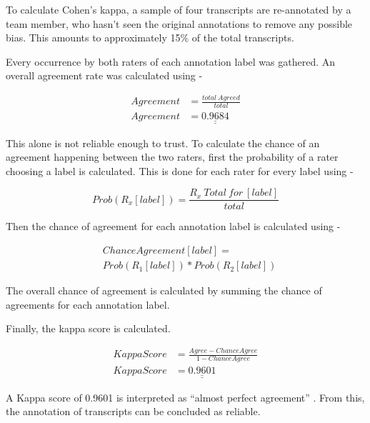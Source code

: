 \documentclass[hidelinks, 11pt]{article}
\begin{document}
To calculate Cohen's kappa, a sample of four transcripts are re-annotated by a team member, who hasn't seen the original annotations to remove any possible bias. This amounts to approximately 15\% of the total transcripts.

Every occurrence by both raters of each annotation label was gathered. An overall agreement rate was calculated using -

\begin{equation} \label{eq:kappa}
  \begin{split}
    Agreement & = \frac{total \: Agreed}{total} \\
    Agreement & = \underline{\underline{0.9684}}
  \end{split}
\end{equation}

This alone is not reliable enough to trust.\cite{Sun_2011} To calculate the chance of an agreement happening between the two raters, first the probability of a rater choosing a label is calculated. This is done for each rater for every label using -

\begin{equation}
  Prob(R_x[label]) = \frac{R_x \: Total \: for \: [label]}{total}
\end{equation}

Then the chance of agreement for each annotation label is calculated using -

\begin{equation}
  \begin{split}
    &ChanceAgreement[label] = \\
    &Prob(R_1[label]) * Prob(R_2[label])
  \end{split}
\end{equation}

The overall chance of agreement is calculated by summing the chance of agreements for each annotation label.

Finally, the kappa score is calculated.

\begin{equation}
  \begin{split}
    KappaScore & = \frac{Agree - ChanceAgree}{1 - ChanceAgree} \\
    KappaScore & = \underline{\underline{0.9601}}
  \end{split}
\end{equation}

A Kappa score of 0.9601 is interpreted as ``almost perfect agreement'' \cite{Cohen_1960}. From this, the annotation of transcripts can be concluded as reliable.
\end{document}
